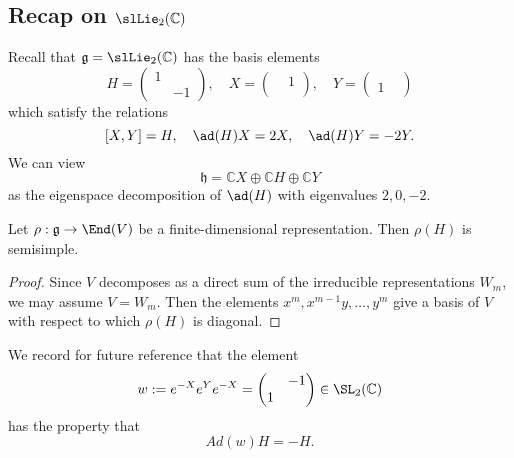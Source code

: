\documentclass[reqno]{amsart} 
\begin{document}
\subsection{Recap on \texorpdfstring{$\slLie_2(\mathbb{C})$}{sl2C}}
\label{sec:org77c4374}
Recall that $\mathfrak{g} = \slLie_2(\mathbb{C})$ has the basis elements
\begin{equation*}
  H = 
\begin{pmatrix}
    1 &  \\
      & -1
  \end{pmatrix}
,
  \quad
  X = 
\begin{pmatrix}
    & 1 \\
    & 
  \end{pmatrix}
,
  \quad
  Y = 
\begin{pmatrix}
    &  \\
    1 & 
  \end{pmatrix}
\end{equation*}
which satisfy the relations
\begin{equation*}
  {} [X,Y] = H, \quad \ad(H) X = 2 X, \quad \ad(H) Y = -2 Y.
\end{equation*}
We can view
\begin{equation*}
  \mathfrak{h} = \mathbb{C} X \oplus \mathbb{C} H \oplus \mathbb{C} Y
\end{equation*}
as the eigenspace decomposition of $\ad(H)$ with eigenvalues $2, 0, -2$.

\begin{theorem}
  Let $\rho : \mathfrak{g} \rightarrow \End(V)$ be a finite-dimensional representation.  Then $\rho(H)$ is semisimple.
\end{theorem}
\begin{proof}
  Since $V$ decomposes as a direct sum of the irreducible representations $W_m$, we may assume $V = W_m$.  Then the elements $x^m, x^{m-1} y, \dotsc, y^m$ give a basis of $V$ with respect to which $\rho(H)$ is diagonal.
\end{proof}

We record for future reference that the element
\begin{equation}\label{eq:weyl-element-via-exponentials-sl2}
  w := e^{-X} e^Y e^{-X} = 
\begin{pmatrix}
    & -1 \\
    1 & 
  \end{pmatrix}
 \in \SL_2(\mathbb{C})
\end{equation}
has the property that
\begin{equation}\label{eq:weyl-element-via-expoenntials-sl2-acting-as-reflection}
  Ad(w) H = - H.
\end{equation}
\end{document}
